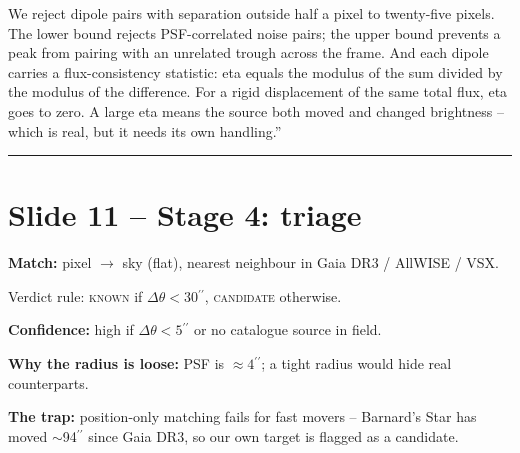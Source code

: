 \documentclass[11pt,a4paper]{article}
\newcommand{\arcsec}{\ensuremath{{}^{\prime\prime}}}
\begin{document}
We reject dipole pairs with separation outside half a pixel to twenty-five pixels. The lower bound
rejects PSF-correlated noise pairs; the upper bound prevents a peak from pairing with an unrelated
trough across the frame. And each dipole carries a flux-consistency statistic: eta equals the modulus
of the sum divided by the modulus of the difference. For a rigid displacement of the same total flux,
eta goes to zero. A large eta means the source both moved and changed brightness -- which is real, but
it needs its own handling.''
\par\smallskip\noindent\rule{\linewidth}{0.3pt}

\section{Slide 11 -- Stage 4: triage}

\textbf{Match:} pixel $\to$ sky (flat), nearest neighbour in Gaia DR3 / AllWISE / VSX.

Verdict rule: \textsc{known} if $\Delta\theta<30\arcsec$, \textsc{candidate} otherwise.

\textbf{Confidence:} high if $\Delta\theta<5\arcsec$ or no catalogue source in field.

\textbf{Why the radius is loose:} PSF is $\approx4\arcsec$; a tight radius would hide real
counterparts.

\textbf{The trap:} position-only matching fails for fast movers -- Barnard's Star has moved
$\sim$94\arcsec{} since Gaia DR3, so our own target is flagged as a candidate.

\begin{center}
\end{center}
\end{document}
